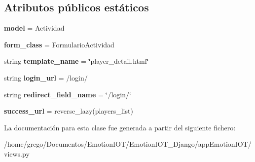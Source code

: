 \subsection*{Atributos públicos estáticos}
\begin{DoxyCompactItemize}
\item 
{\bfseries model} = Actividad\hypertarget{classappEmotionIOT_1_1views_1_1Update__player_aae441306ac0aa299f521de05886a1f79}{}\label{classappEmotionIOT_1_1views_1_1Update__player_aae441306ac0aa299f521de05886a1f79}

\item 
{\bfseries form\+\_\+class} = Formulario\+Actividad\hypertarget{classappEmotionIOT_1_1views_1_1Update__player_a2c3f3789560d226f39d6b4a5c6b595b4}{}\label{classappEmotionIOT_1_1views_1_1Update__player_a2c3f3789560d226f39d6b4a5c6b595b4}

\item 
string {\bfseries template\+\_\+name} = \char`\"{}player\+\_\+detail.\+html\char`\"{}\hypertarget{classappEmotionIOT_1_1views_1_1Update__player_a60ad025ea3cfef6d8d0c434fb14c389c}{}\label{classappEmotionIOT_1_1views_1_1Update__player_a60ad025ea3cfef6d8d0c434fb14c389c}

\item 
string {\bfseries login\+\_\+url} = \textquotesingle{}/login/\textquotesingle{}\hypertarget{classappEmotionIOT_1_1views_1_1Update__player_ad0bea7b3daceaeda76203daeacb7c93b}{}\label{classappEmotionIOT_1_1views_1_1Update__player_ad0bea7b3daceaeda76203daeacb7c93b}

\item 
string {\bfseries redirect\+\_\+field\+\_\+name} = \char`\"{}/login/\char`\"{}\hypertarget{classappEmotionIOT_1_1views_1_1Update__player_abbc8f62c3d1630f43241a2135aa30a59}{}\label{classappEmotionIOT_1_1views_1_1Update__player_abbc8f62c3d1630f43241a2135aa30a59}

\item 
{\bfseries success\+\_\+url} = reverse\+\_\+lazy(\textquotesingle{}players\+\_\+list\textquotesingle{})\hypertarget{classappEmotionIOT_1_1views_1_1Update__player_a7cec4c10b4eface8f177623c9e5bb4cd}{}\label{classappEmotionIOT_1_1views_1_1Update__player_a7cec4c10b4eface8f177623c9e5bb4cd}

\end{DoxyCompactItemize}


La documentación para esta clase fue generada a partir del siguiente fichero\+:\begin{DoxyCompactItemize}
\item 
/home/grego/\+Documentos/\+Emotion\+I\+O\+T/\+Emotion\+I\+O\+T\+\_\+\+Django/app\+Emotion\+I\+O\+T/views.\+py\end{DoxyCompactItemize}
